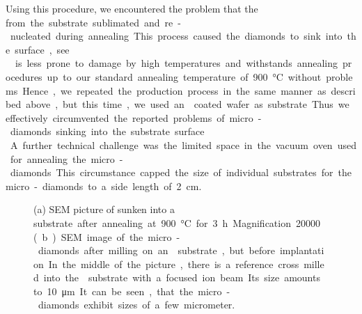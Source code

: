 		Using this procedure, we encountered the problem that the \si from the substrate sublimated and re-nucleated during annealing.
		This process caused the diamonds to sink into the \si surface, see .
		\\
		\Ir is less prone to damage by high temperatures and withstands annealing procedures up to our standard annealing temperature of \SI{900}{\celsius} without problems.
		Hence, we repeated the production process in the same manner as described above, but this time, we used an \ir coated \si wafer as substrate.
		Thus we effectively circumvented the reported problems of micro-diamonds sinking into the substrate surface.
		\\
		A further technical challenge was the limited space in the vacuum oven used for annealing the micro-diamonds.
		This circumstance capped the size of individual substrates for the micro-diamonds to a side length of \SI{2}{cm}.

		\begin{figure}[htp]
			\begin{subfigure}[t]{ 0.49\linewidth}
				\centering
				\caption{}\label{subfig::sunken_nd}
			\end{subfigure}
			\hfill
			\begin{subfigure}[t]{ 0.49\linewidth}
				\centering
				\caption{}\label{subfig::microdiamonds}
			\end{subfigure}
			\caption[SEM images of micro and nanodiamonds]{(a) SEM picture of \nds sunken into a \si substrate after annealing at \SI{900}{\celsius} for \SI{3}{h}. Magnification \num{20000}. (b) SEM image of the micro-diamonds after milling on an \ir substrate, but before implantation. In the middle of the picture, there is a reference cross milled into the \ir substrate with a focused ion beam. Its size amounts to \SI{10}{\micro\meter}. It can be seen, that the micro-diamonds exhibit sizes of a few micrometer.}
		\end{figure}

